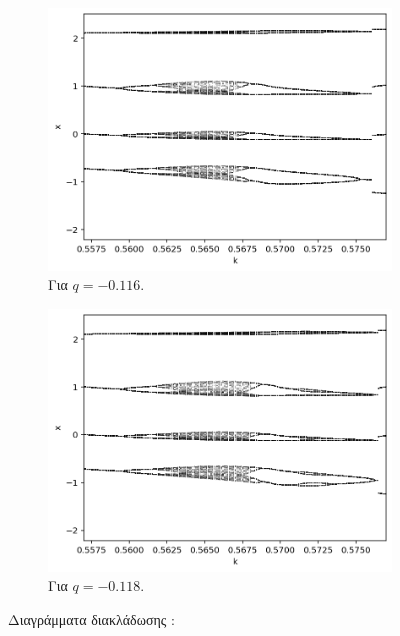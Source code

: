\begin{figure}[h!]
\begin{subfigure}[b]{0.4\textwidth}
		\includegraphics[width=\textwidth]{LateX images/graphs/g4}
		\caption{Για $q=-0.116$.}
		\label{f:g5}
	\end{subfigure}
	\hfill
	\begin{subfigure}[b]{0.4\textwidth}
		\centering
		\includegraphics[width=\textwidth]{LateX images/graphs/g5}
		\caption{Για $q=-0.118$.}
		\label{f:g6}
	\end{subfigure}
\caption{Διαγράμματα διακλάδωσης : }
\label{f:g2}
\end{figure}




